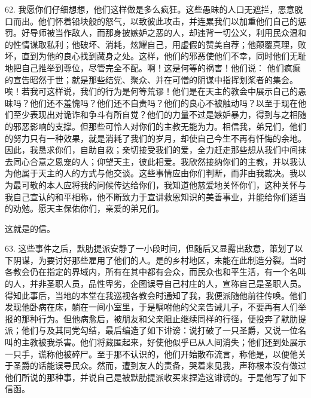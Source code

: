 62. 我愿你们仔细想想，他们这样做是多么疯狂。这些愚昧的人口无遮拦，恶意脱口而出。他们怀着铅块般的怒气，以致彼此攻击，并连累我们以加重他们自己的惩罚。好导师被当作敌人，而那身披嫉妒之恶的人，却违背一切公义，利用民众温和的性情谋取私利；他破坏、消耗，炫耀自己，用虚假的赞美自荐；他颠覆真理，败坏，直到为他的良心找到藏身之处。这样，他们的邪恶使他们不幸，同时他们无耻地把自己推举到尊位，尽管完全不配。啊！这是何等的祸害！他们说： 他们疯癫的宣告昭然于世；就是那些结党、聚众、并在可憎的阴谋中指挥划桨者的集会。唉！若我可这样说，我们的行为是何等荒谬！他们是在天主的教会中展示自己的愚昧吗？他们还不羞愧吗？他们还不自责吗？他们的良心不被触动吗？以至于现在他们至少表现出对诡诈和争斗有所自觉？他们的力量不过是嫉妒暴力，得到与之相随的邪恶影响的支撑。但那些可怜人对你们的主教无能为力。相信我，弟兄们，他们的努力只有一种效果，就是消耗了我们的岁月，却使自己今生不再有忏悔的余地。因此，我恳求你们，自助自救；亲切接受我们的爱，全力赶走那些想从我们中间抹去同心合意之恩宠的人；仰望天主，彼此相爱。我欣然接纳你们的主教，并以我认为他属于天主的人的方式与他交谈。这些事情应由你们判断，而非由我裁决。我以为最可敬的本人应将我的问候传达给你们，我知道他慈爱地关怀你们，这种关怀与我自己宣认的和平相称，他不断致力于宣讲救恩知识的美善事业，并能给你们适当的劝勉。愿天主保佑你们，亲爱的弟兄们。\par

这就是的信。\par

63. 这些事件之后，默肋提派安静了一小段时间，但随后又显露出敌意，策划了以下阴谋，为要讨好那些雇用了他们的人。是的乡村地区，未能在此制造分裂。当时各教会仍在指定的界域内，所有在其中都有会众，而民众也和平生活，有一个名叫的人，并非圣职人员，品性卑劣，企图误导自己村庄的人，宣称自己是圣职人员。得知此事后，当地的本堂在我巡视各教会时通知了我，我便派随他前往传唤。他们发现他卧病在床，躺在一间小室里，于是嘱咐他的父亲告诫儿子，不要再有人们举报的那种行为。但他病愈后，被朋友和父亲阻止继续同样的行径，便投奔了默肋提派；他们与及其同党勾结，最后编造了如下诽谤：说打破了一只圣爵，又说一位名叫的主教被我杀害。他们将藏匿起来，好使他似乎已从人间消失；他们还到处展示一只手，谎称他被碎尸。至于那不认识的，他们开始散布流言，称他是，以便他关于圣爵的话能误导民众。然而，遭到友人的责备，哭着来见我，声称根本没有做过他们所说的那种事，并说自己是被默肋提派收买来捏造这诽谤的。于是他写了如下信函。\par

